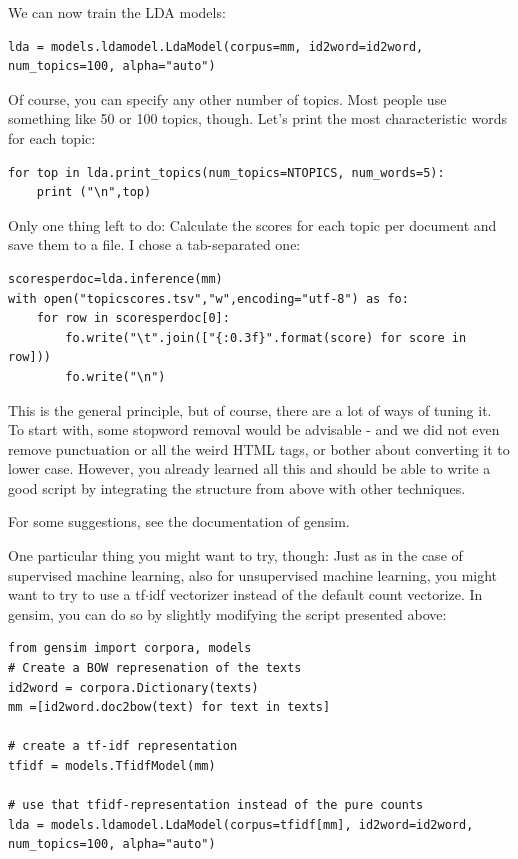 \documentclass[a4paper,12pt]{book}
\begin{document}
We can now train the LDA models:
\begin{lstlisting}
lda = models.ldamodel.LdaModel(corpus=mm, id2word=id2word, num_topics=100, alpha="auto")
\end{lstlisting}

Of course, you can specify any other number of topics. Most people use something like 50 or 100 topics, though. Let's print the most characteristic words for each topic:

\begin{lstlisting}
for top in lda.print_topics(num_topics=NTOPICS, num_words=5):
    print ("\n",top)

\end{lstlisting}

Only one thing left to do: Calculate the scores for each topic per document and save them to a file. I chose a tab-separated one:

\begin{lstlisting}
scoresperdoc=lda.inference(mm)
with open("topicscores.tsv","w",encoding="utf-8") as fo:
    for row in scoresperdoc[0]:
        fo.write("\t".join(["{:0.3f}".format(score) for score in row]))
        fo.write("\n")
\end{lstlisting}

This is the general principle, but of course, there are a lot of ways of tuning it. To start with, some stopword removal would be advisable - and we did not even remove punctuation or all the weird HTML tags, or bother about converting it to lower case. However, you already learned all this and should be able to write a good script by integrating the structure from above with other techniques.

For some suggestions, see the documentation of gensim.%

One particular thing you might want to try, though: Just as in the case of supervised machine learning, also for unsupervised machine learning, you might want to try to use a tf$\cdot$idf vectorizer instead of the default count vectorize. In gensim, you can do so by slightly modifying the script presented above:


\begin{lstlisting}
from gensim import corpora, models
# Create a BOW represenation of the texts
id2word = corpora.Dictionary(texts)
mm =[id2word.doc2bow(text) for text in texts]

# create a tf-idf representation
tfidf = models.TfidfModel(mm)

# use that tfidf-representation instead of the pure counts
lda = models.ldamodel.LdaModel(corpus=tfidf[mm], id2word=id2word, num_topics=100, alpha="auto")
\end{lstlisting}
\end{document}

